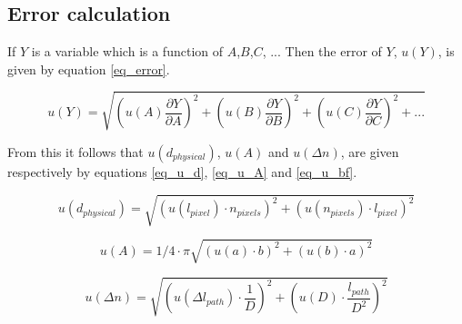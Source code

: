 \subsection{Error calculation}

If $Y$ is a variable which is a function of $A$,$B$,$C$, ... Then the error of $Y$, $u(Y)$, is given by equation \ref{eq_error}.

\begin{equation}
	\label{eq_error}
	u(Y) = \sqrt{\left(u(A) \frac{\partial Y}{\partial A}\right)^2 + \left(u(B) \frac{\partial Y}{\partial B}\right)^2 + \left(u(C) \frac{\partial Y}{\partial C}\right)^2 + ...}
\end{equation}

From this it follows that $u(d_{physical})$, $u(A)$ and $u(\Delta n)$, are given respectively by equations \ref{eq_u_d}, \ref{eq_u_A} and \ref{eq_u_bf}.

\begin{equation}
	\label{eq_u_d}
	u(d_{physical}) = \sqrt{\left( u(l_{pixel}) \cdot n_{pixels} \right)^2 + \left( u(n_{pixels}) \cdot l_{pixel} \right)^2}
\end{equation}

\begin{equation}
	\label{eq_u_A}
	u(A) = 1/4 \cdot \pi  \sqrt{(u(a) \cdot b)^2 + (u(b) \cdot a)^2}
\end{equation}

\begin{equation}
	\label{eq_u_bf}
	u(\Delta n) = \sqrt{\left( u(\Delta l_{path}) \cdot \frac{1}{D}\right)^2 + \left( u(D) \cdot \frac{l_{path}}{D^2}\right)^2}
\end{equation}

